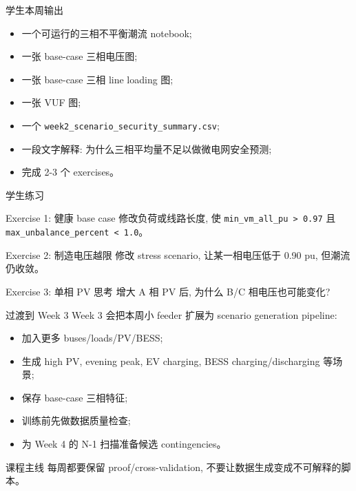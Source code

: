\documentclass[aspectratio=169,10pt]{ctexbeamer}
\newcommand{\code}[1]{\texttt{#1}}
\begin{document}
\begin{frame}{学生本周输出}
\begin{itemize}
  \item 一个可运行的三相不平衡潮流 notebook;
  \item 一张 base-case 三相电压图;
  \item 一张 base-case 三相 line loading 图;
  \item 一张 VUF 图;
  \item 一个 \code{week2\_scenario\_security\_summary.csv};
  \item 一段文字解释: 为什么三相平均量不足以做微电网安全预测;
  \item 完成 2-3 个 exercises。
\end{itemize}
\end{frame}

\begin{frame}{学生练习}
\begin{block}{Exercise 1: 健康 base case}
修改负荷或线路长度, 使 \code{min\_vm\_all\_pu > 0.97} 且 \code{max\_unbalance\_percent < 1.0}。
\end{block}
\begin{block}{Exercise 2: 制造电压越限}
修改 stress scenario, 让某一相电压低于 0.90 pu, 但潮流仍收敛。
\end{block}
\begin{block}{Exercise 3: 单相 PV 思考}
增大 A 相 PV 后, 为什么 B/C 相电压也可能变化?
\end{block}
\end{frame}

\begin{frame}{过渡到 Week 3}
Week 3 会把本周小 feeder 扩展为 scenario generation pipeline:
\begin{itemize}
  \item 加入更多 buses/loads/PV/BESS;
  \item 生成 high PV, evening peak, EV charging, BESS charging/discharging 等场景;
  \item 保存 base-case 三相特征;
  \item 训练前先做数据质量检查;
  \item 为 Week 4 的 N-1 扫描准备候选 contingencies。
\end{itemize}
\vspace{0.6em}
\begin{alertblock}{课程主线}
每周都要保留 proof/cross-validation, 不要让数据生成变成不可解释的脚本。
\end{alertblock}
\end{frame}
\end{document}
